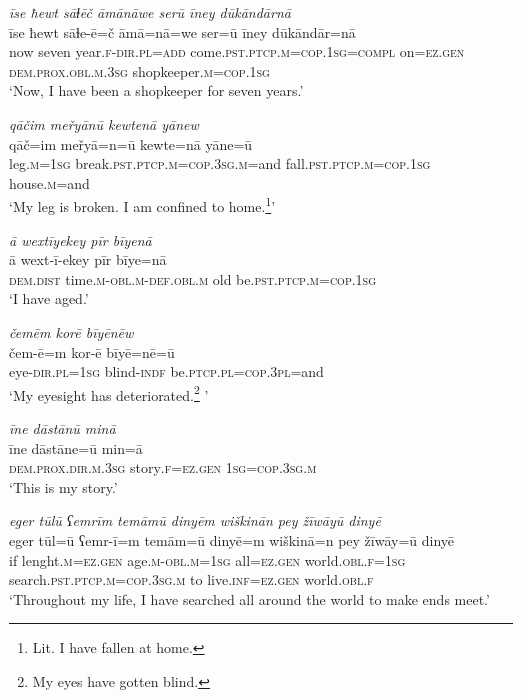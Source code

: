\ea \label{ŽM.8}
\textit{īse ħewt sāɫēč āmānāwe serū īney dūkāndārnā} \\ 
\gll īse ħewt sāɫe-ē=č āmā=nā=we ser=ū īney dūkāndār=nā \\ 
 now seven year\textsc{.f}\textsc{-dir}\textsc{.pl}\textsc{=add} come\textsc{.pst}\textsc{.ptcp}\textsc{.m}\textsc{=cop}\textsc{.\textsc{1sg}}\textsc{=compl} on\textsc{=ez.gen} \textsc{dem.prox}\textsc{.obl}\textsc{.m}\textsc{.3sg} shopkeeper\textsc{.m}\textsc{=cop}\textsc{.\textsc{1sg}} \\ 
\glt `Now, I have been a shopkeeper for seven years.'
\z 
 
\ea \label{ŽM.9}
\textit{qāčim meřyānū kewtenā yānew} \\ 
\gll qāč=im meřyā=n=ū kewte=nā yāne=ū \\ 
 leg\textsc{.m}\textsc{=\textsc{1sg}} break\textsc{.pst}\textsc{.ptcp}\textsc{.m}\textsc{=cop}\textsc{.3sg}\textsc{.m}=and fall\textsc{.pst}\textsc{.ptcp}\textsc{.m}\textsc{=cop}\textsc{.\textsc{1sg}} house\textsc{.m}=and \\ 
\glt `My leg is broken. I am confined to home.\footnote{Lit. I have fallen at home.}'
\z 
 
\ea \label{ŽM.10}
\textit{ā wextīyekey pīr bīyenā} \\ 
\gll ā wext-ī-ekey pīr bīye=nā \\ 
 \textsc{dem.dist} time\textsc{.m}\textsc{-obl}\textsc{.m}\textsc{-def}\textsc{.obl}\textsc{.m} old be\textsc{.pst}\textsc{.ptcp}\textsc{.m}\textsc{=cop}\textsc{.\textsc{1sg}} \\ 
\glt `I have aged.'
\z 
 
\ea \label{ŽM.11}
\textit{čemēm korē bīyēnēw} \\ 
\gll čem-ē=m kor-ē bīyē=nē=ū \\ 
 eye\textsc{-dir}\textsc{.pl}\textsc{=\textsc{1sg}} blind\textsc{-indf} be\textsc{.ptcp}\textsc{.pl}\textsc{=cop}\textsc{.3pl}=and \\ 
\glt `My eyesight has deteriorated.\footnote{My eyes have gotten blind.} '
\z 
 
\ea \label{ŽM.12}
\textit{īne dāstānū minā} \\ 
\gll īne dāstāne=ū min=ā \\ 
 \textsc{dem.prox}\textsc{.dir}\textsc{.m}\textsc{.3sg} story\textsc{.f}\textsc{=ez.gen} \textsc{1sg}\textsc{=cop}\textsc{.3sg}\textsc{.m} \\ 
\glt `This is my story.'
\z 
 
\ea \label{ŽM.13}
\textit{eger tūlū ʕemrīm temāmū dinyēm wiškinān pey žīwāyū dinyē} \\ 
\gll eger tūl=ū ʕemr-ī=m temām=ū dinyē=m wiškinā=n pey žīwāy=ū dinyē \\ 
 if lenght\textsc{.m}\textsc{=ez.gen} age\textsc{.m}\textsc{-obl}\textsc{.m}\textsc{=\textsc{1sg}} all\textsc{=ez.gen} world\textsc{.obl}\textsc{.f}\textsc{=\textsc{1sg}} search\textsc{.pst}\textsc{.ptcp}\textsc{.m}\textsc{=cop}\textsc{.3sg}\textsc{.m} to live\textsc{.inf}\textsc{=ez.gen} world\textsc{.obl}\textsc{.f} \\ 
\glt `Throughout my life, I have searched all around the world to make ends meet.'
\z 
 
